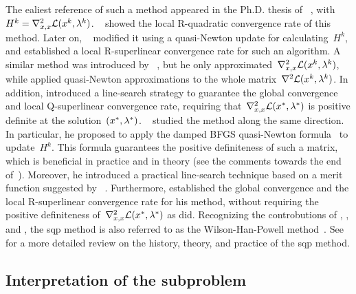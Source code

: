 The ealiest reference of such a method appeared in the Ph.D. thesis of \citeauthor{Wilson_1963}~\cite{Wilson_1963}, with~$H^k = \nabla_{x, x}^2 \lag(\iter[k], \lm[k])$.
~\cite{Robinson_1974} showed the local R-quadratic convergence rate of this method.
Later on, \citeauthor{Garcia-Palomares_Mangasarian_1976}~\cite{Garcia-Palomares_1973,Garcia-Palomares_Mangasarian_1976} modified it using a quasi-Newton update for calculating~$H^k$, and established a local R-superlinear convergence rate for such an algorithm.
A similar method was introduced by \citeauthor{Han_1976}~\cite{Han_1976,Han_1977}, but he only approximated~$\nabla_{x, x}^2 \lag(\iter[k], \lm[k])$, while \citeauthor{Garcia-Palomares_Mangasarian_1976} applied quasi-Newton approximations to the whole matrix~$\nabla^2 \lag(\iter[k], \lm[k])$.
In addition, \citeauthor{Han_1976} introduced a line-search strategy to guarantee the global convergence and local Q-superlinear convergence rate, requiring that~$\nabla_{x, x}^2 \lag(\iter[\ast], \lm[\ast])$ is positive definite at the solution~$(\iter[\ast], \lm[\ast])$.
~\cite{Powell_1978b,Powell_1978a,Powell_1978c} studied the method along the same direction.
In particular, he proposed to apply the damped BFGS quasi-Newton formula~\cite[eq.~(5.8),~(5.9), and~(5.10)]{Powell_1978b} to update~$H^k$.
This formula guarantees the positive definiteness of such a matrix, which is beneficial in practice and in theory (see the comments towards the end of~\cite[\S~2]{Powell_1978a}).
Moreover, he introduced a practical line-search technique based on a merit function suggested by \citeauthor{Han_1976}~\cite{Han_1976}.
Furthermore, \citeauthor{Powell_1978c} established the global convergence and the local R-superlinear convergence rate for his method, without requiring the positive definiteness of~$\nabla_{x, x}^2 \lag(\iter[\ast], \lm[\ast])$ as \citeauthor{Han_1976} did.
Recognizing the controbutions of \citeauthor{Wilson_1963}, , and \citeauthor{Powell_1978a}, the \gls{sqp} method is also referred to as the Wilson-Han-Powell method~\cite{Schittkowski_1981,Burke_1992}.
See~\cite{Boggs_Tolle_1995} for a more detailed review on the history, theory, and practice of the \gls{sqp} method.

\subsection{Interpretation of the subproblem}

